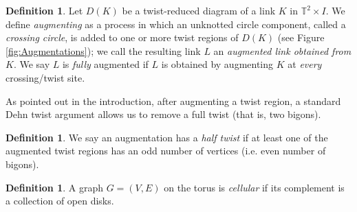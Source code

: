 \documentclass[11pt]{amsart}
\newcommand{\torus}{{\mathbb{T}^2}}
\theoremstyle{plain}
\theoremstyle{definition}
\newtheorem{definition}[theorem]{Definition}
\newtheorem{remark}[theorem]{Remark}
\begin{document}
\begin{definition}
Let $D(K)$ be a twist-reduced diagram of a link $K$ in $\torus \times I$.
We define
\emph{augmenting} as a process in which an unknotted circle component,
called a \emph{crossing circle},
is added to one or more twist regions of $D(K)$
(see Figure \ref{fig:Augmentations});
we call the resulting link $L$ an \emph{augmented link obtained from $K$}.
We say $L$ is \emph{fully} augmented if $L$ is obtained by augmenting
$K$ at \emph{every} crossing/twist site.
\label{d:augmentation}
\end{definition}


As pointed out in the introduction,
after augmenting a twist region,
a standard Dehn twist argument allows us to remove
a full twist (that is, two bigons).

\begin{definition}
We say an augmentation has a \emph{half twist}
if at least one of the augmented twist regions
has an odd number of vertices (i.e. even number of bigons).
\label{d:half-twist}
\end{definition}



\begin{definition}
A graph $G = (V,E)$ on the torus is \emph{cellular}
if its complement is a collection of open disks.
\label{d:cellular}
\end{definition}


\end{document}
